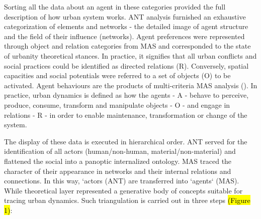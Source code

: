 \documentclass[11pt]{report}
\begin{document}
Sorting all the data about an agent in these categories provided the full description of how urban system works. ANT analysis furnished an exhaustive categorization of elements and networks - the detailed image of agent structure and the field of their influence (networks). Agent preferences were represented through object and relation categories from MAS and corresponded to the state of urbanity theoretical stances. In practice, it signifies that all urban conflicts and social practices could be identified as directed relations (R). Conversely, spatial capacities and social potentials were referred to a set of objects (O) to be activated. Agent behaviours are the products of multi-criteria MAS analysis (\cite{Arsanjani et al. 2013}). In practice, urban dynamics is defined as how the agents - A - behave to perceive, produce, consume, transform and manipulate objects - O - and engage in relations - R - in order to enable maintenance, transformation or change of the system.

The display of these data is executed in hierarchical order. ANT served for the identification of all actors (human/non-human, material/non-material) and flattened the social into a panoptic internalized ontology. MAS traced the character of their appearance in networks and their internal relations and connections. In this way, `actors (ANT) are transferred into `agents` (MAS). While theoretical layer represented a generative body of concepts suitable for tracing urban dynamics. Such triangulation is carried out in three steps \hl{(Figure 1)}:
\end{document}

